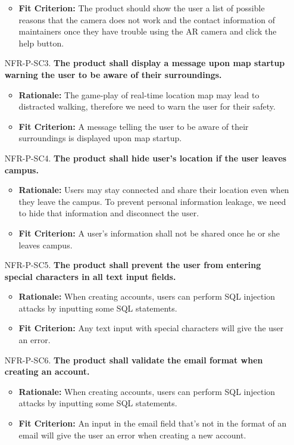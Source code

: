 \documentclass{article}
\begin{document}
\begin{itemize}
\begin{itemize}
        \item \textbf{Fit Criterion:} The product should show the user a list of possible reasons that the camera does not work and the contact information of maintainers once they have trouble using the AR camera and click the help button.
    \end{itemize}
    \item[NFR-P-SC3.] \textbf{The product shall display a message upon map startup warning the user to be aware of their surroundings.}
    \begin{itemize}
        \item \textbf{Rationale:} The game-play of real-time location map may lead to distracted walking, therefore we need to warn the user for their safety.
        \item \textbf{Fit Criterion:} A message telling the user to be aware of their surroundings is displayed upon map startup.
    \end{itemize}
    \item[NFR-P-SC4.] \textbf{The product shall hide user's location if the user leaves campus.}
    \begin{itemize}
        \item \textbf{Rationale:} Users may stay connected and share their location even when they leave the campus. To prevent personal information leakage, we need to hide that information and disconnect the user.
        \item \textbf{Fit Criterion:} A user's information shall not be shared once he or she leaves campus.
    \end{itemize}
    \item[NFR-P-SC5.] \textbf{The product shall prevent the user from entering special characters in all text input fields.}
    \begin{itemize}
        \item \textbf{Rationale:} When creating accounts, users can perform SQL injection attacks by inputting some SQL statements.
        \item \textbf{Fit Criterion:} Any text input with special characters will give the user an error.
    \end{itemize}
    \item[NFR-P-SC6.] \textbf{The product shall validate the email format when creating an account.}
    \begin{itemize}
        \item \textbf{Rationale:} When creating accounts, users can perform SQL injection attacks by inputting some SQL statements.
        \item \textbf{Fit Criterion:} An input in the email field that's not in the format of an email will give the user an error when creating a new account.
    \end{itemize}
\end{itemize}
\end{document}
